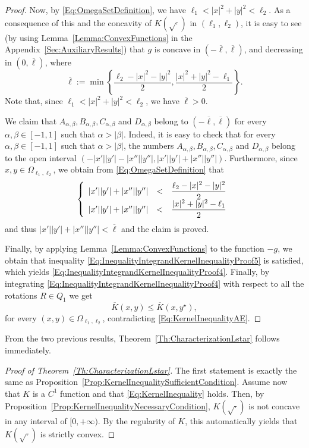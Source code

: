 \begin{proof}
Now, by \eqref{Eq:OmegaSetDefinition}, we have $\ell_1 < |x|^2+|y|^2 <\ell_2$. As a consequence of this and the concavity of $K(\sqrt{\cdot})$ in $(\ell_1,\ell_2)$, it is easy to see (by using Lemma~\ref{Lemma:ConvexFunctions} in the Appendix~\ref{Sec:AuxiliaryResults}) that $g$ is concave in $ \left( -\overline{\ell}, \overline{\ell}\right) $, and decreasing in $(0,\overline{\ell})$, where 
$$
\overline{\ell} := \min{\left\{\frac{\ell_2-|x|^2-|y|^2}{2},\frac{|x|^2+|y|^2-\ell_1}{2}\right\}}.$$
Note that, since $\ell_1 < |x|^2+|y|^2 <\ell_2$, we have $\overline{\ell}>0$.


We claim that $A_{\alpha,\beta}, B_{\alpha,\beta}, C_{\alpha,\beta}$ and $D_{\alpha,\beta}$ belong to $(-\overline{\ell},\overline{\ell})$ for every $\alpha, \beta \in [-1,1]$ such that $\alpha>|\beta|$. Indeed, it is easy to check that for every $\alpha, \beta \in [-1,1]$ such that $\alpha>|\beta|$, the numbers $A_{\alpha,\beta}, B_{\alpha,\beta}, C_{\alpha,\beta}$ and $D_{\alpha,\beta}$ belong to the open interval $(-|x'||y'|-|x''||y''|,|x'||y'|+|x''||y''|)$. Furthermore, since $x,y \in \Omega_{\ell_1,\ell_2}$, we obtain from \eqref{Eq:OmegaSetDefinition} that
$$
\left\{\begin{array}{rcll}
|x'||y'|+|x''||y''|&<&\dfrac{\ell_2-|x|^2-|y|^2}{2}\\
|x'||y'|+|x''||y''|&<&\dfrac{|x|^2+|y|^2-\ell_1}{2}
\end{array} \right. 
$$
and thus $ |x'||y'|+|x''||y''|<\overline{\ell}$ and the claim is proved.

Finally, by applying Lemma~\ref{Lemma:ConvexFunctions} to the function $-g$, we obtain that inequality \eqref{Eq:InequalityIntegrandKernelInequalityProof5} is satisfied, which yields \eqref{Eq:InequalityIntegrandKernelInequalityProof4}. Finally, by integrating \eqref{Eq:InequalityIntegrandKernelInequalityProof4} with respect to all the rotations $R\in Q_1$ we get $$ \overline{K}(x,y) \leq \overline{K}(x, y^\star),$$ for every $(x,y)\in \Omega_{\ell_1,\ell_2}$, contradicting \eqref{Eq:KernelInequalityAE}.
\end{proof}

From the two previous results, Theorem~\ref{Th:CharacterizationLstar} follows immediately.

\begin{proof}[Proof of Theorem~\ref{Th:CharacterizationLstar}]
	The first statement is exactly the same as Proposition~\ref{Prop:KernelInequalitySufficientCondition}. Assume now that $K$ is a $C^1$ function and that \eqref{Eq:KernelInequality} holds. Then, by Proposition~\ref{Prop:KernelInequalityNecessaryCondition}, $K(\sqrt{\cdot})$ is not concave in any interval of $[0,+\infty)$. By the regularity of $K$, this automatically yields that $K(\sqrt{\cdot})$ is strictly convex.
\end{proof}

